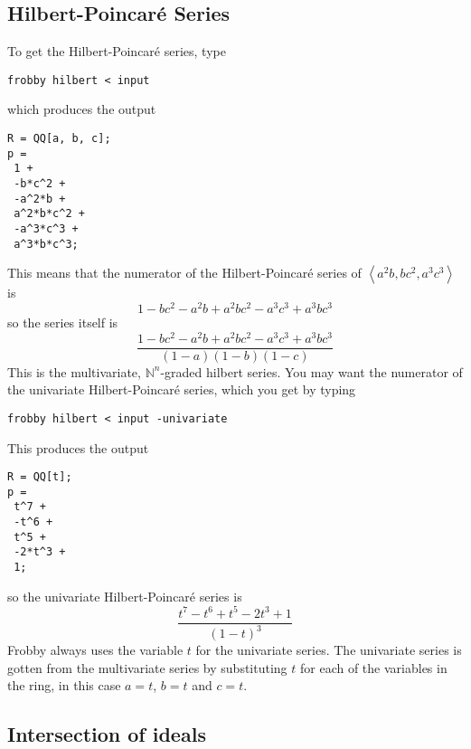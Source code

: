 \documentclass{amsart}
\theoremstyle{definition}
\newcommand{\hp}{Hilbert-Poincar\'e}
\newcommand{\hps}{Hilbert-Poincar\'e series}
\newcommand{\N}{\mathbb{N}}
\newcommand{\ideal}[1]{\left<#1\right>}
\begin{document}
\subsection{\hp{} Series}

To get the \hps{}, type
\begin{verbatim}
frobby hilbert < input
\end{verbatim}
which produces the output
\begin{verbatim}
R = QQ[a, b, c];
p =
 1 +
 -b*c^2 +
 -a^2*b +
 a^2*b*c^2 +
 -a^3*c^3 +
 a^3*b*c^3;
\end{verbatim}
This means that the numerator of the \hps{} of $\ideal{a^2b,bc^2,a^3c^3}$ is
\[
 1 
 -bc^2 
 -a^2b +
 a^2bc^2 
 -a^3c^3 +
 a^3bc^3
\]
so the series itself is
\[
\frac{ 
 1 
 -bc^2 
 -a^2b +
 a^2bc^2 
 -a^3c^3 +
 a^3bc^3
}{
(1-a)(1-b)(1-c)}
\]
This is the multivariate, $\N^n$-graded hilbert series. You may want
the numerator of the univariate \hps{}, which you get by typing
\begin{verbatim}
frobby hilbert < input -univariate
\end{verbatim}
This produces the output
\begin{verbatim}
R = QQ[t];
p =
 t^7 +
 -t^6 +
 t^5 +
 -2*t^3 +
 1;
\end{verbatim}
so the univariate \hps{} is
\[
\frac{
 t^7 
 -t^6 +
 t^5 
 -2t^3 +
 1}{(1-t)^3}
\]
Frobby always uses the variable $t$ for the univariate series. The
univariate series is gotten from the multivariate series by
substituting $t$ for each of the variables in the ring, in this case
$a=t$, $b=t$ and $c=t$.

\subsection{Intersection of ideals}
\end{document}
